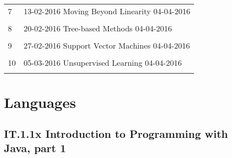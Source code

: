 \documentclass[a4paper,12pt]{article} %
\begin{document}
\begin{longtable}{|l|p{11cm}|l|c|l|}
	\hline
	& & & &  \\
	\hline
	7 & \multicolumn{4}{|l|}{13-02-2016 \hfill Moving Beyond Linearity \hfill 04-04-2016}\\
	\hline
	& & & &  \\
	\hline
	8 & \multicolumn{4}{|l|}{20-02-2016 \hfill Tree-based Methods \hfill 04-04-2016}\\
	\hline
	& & & &  \\
	\hline
	9 & \multicolumn{4}{|l|}{27-02-2016 \hfill Support Vector Machines \hfill 04-04-2016}\\
	\hline
	& & & &  \\
	\hline
	10 & \multicolumn{4}{|l|}{05-03-2016 \hfill Unsupervised Learning \hfill 04-04-2016}\\
	\hline
	& & & &  \\
	\hline
\end{longtable}



\newpage
\section{Languages}
\subsection{IT.1.1x Introduction to Programming with Java, part 1}
\end{document}
